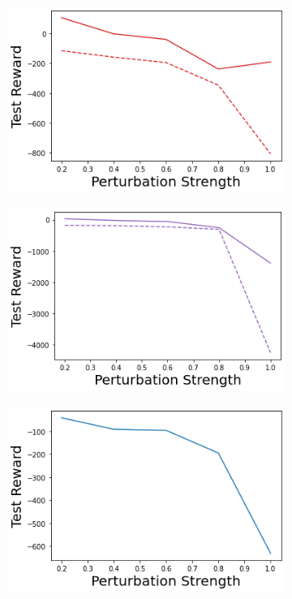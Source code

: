\begin{figure}
    \begin{subfigure}{.24\textwidth}
        \includegraphics[width=\textwidth]{sections/011_icml2022/resources/transition_shift-DropOut-LunarLanderShift-v0-mean_reward_.png}
    \end{subfigure}
    \begin{subfigure}{.24\textwidth}
        \includegraphics[width=\textwidth]{sections/011_icml2022/resources/transition_shift-Ensemble-LunarLanderShift-v0-mean_reward_.png}
    \end{subfigure}
    \begin{subfigure}{.24\textwidth}
        \includegraphics[width=\textwidth]{sections/011_icml2022/resources/transition_shift-DKL-LunarLanderShift-v0-mean_reward_.png}

\end{subfigure}
\end{figure}

